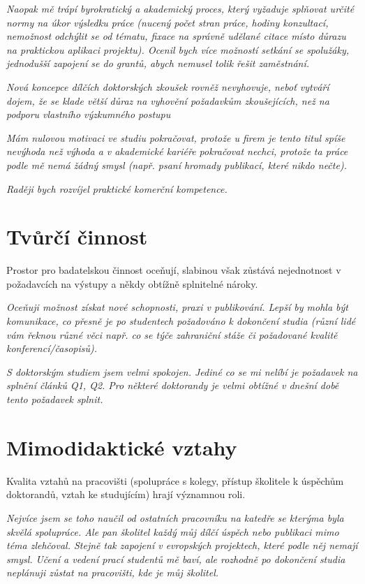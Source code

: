 \documentclass[
  czech,
  14pt,
  a4paper,
  DIV=11,
  numbers=noendperiod]{scrreprt}
\begin{document}
\emph{Naopak mě trápí byrokratický a akademický proces, který vyžaduje
splňovat určité normy na úkor výsledku práce (nucený počet stran práce,
hodiny konzultací, nemožnost odchýlit se od tématu, fixace na správně
udělané citace místo důrazu na praktickou aplikaci projektu). Ocenil
bych více možností setkání se spolužáky, jednodušší zapojení se do
grantů, abych nemusel tolik řešit zaměstnání.}

\emph{Nová koncepce dílčích doktorských zkoušek rovněž nevyhovuje, neboť
vytváří dojem, že se klade větší důraz na vyhovění požadavkům
zkoušejících, než na podporu vlastního výzkumného postupu}

\emph{Mám nulovou motivaci ve studiu pokračovat, protože u firem je
tento titul spíše nevýhoda než výhoda a v akademické kariéře pokračovat
nechci, protože ta práce podle mě nemá žádný smysl (např. psaní hromady
publikací, které nikdo nečte).}

\emph{Raději bych rozvíjel praktické komerční kompetence.}

\section{Tvůrčí činnost}\label{tvux16frux10duxed-ux10dinnost}

Prostor pro badatelskou činnost oceňují, slabinou však zůstává
nejednotnost v požadavcích na výstupy a někdy obtížně splnitelné nároky.

\emph{Oceňuji možnost získat nové schopnosti, praxi v publikování. Lepší
by mohla být komunikace, co přesně je po studentech požadováno k
dokončení studia (různí lidé vám řeknou různé věci např. co se týče
zahraniční stáže či požadované kvalitě konferencí/časopisů).}

\emph{S doktorským studiem jsem velmi spokojen. Jediné co se mi nelíbí
je požadavek na splnění článků Q1, Q2. Pro některé doktorandy je velmi
obtížné v dnešní době tento požadavek splnit.}

\section{Mimodidaktické vztahy}\label{mimodidaktickuxe9-vztahy}

Kvalita vztahů na pracovišti (spolupráce s kolegy, přístup školitele k
úspěchům doktorandů, vztah ke studujícím) hrají významnou roli.

\emph{Nejvíce jsem se toho naučil od ostatních pracovníku na katedře se
kterýma byla skvělá spolupráce. Ale pan školitel každý můj dílčí úspěch
nebo publikaci mimo téma zlehčoval. Stejně tak zapojení v evropských
projektech, které podle něj nemají smysl. Učení a vedení prací studentů
mě baví, ale rozhodně po dokončení studia neplánuji zůstat na
pracovišti, kde je můj školitel.}
\end{document}
